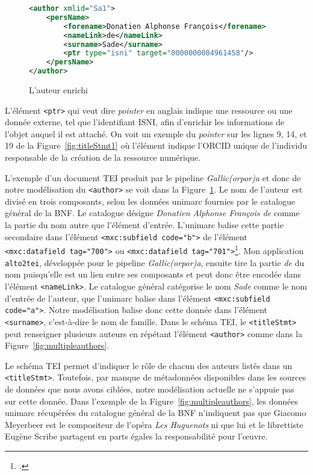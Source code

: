 \documentclass[class=article, crop=false]{standalone}
\begin{document}
\begin{figure}[ht]
\centering
\begin{lstlisting}[language=XML]
<author xmlid="Sa1">
	<persName>
		<forename>Donatien Alphonse François</forename>
		<nameLink>de</nameLink>
		<surname>Sade</surname>
		<ptr type="isni" target="0000000084961458"/>
	</persName>
</author>
\end{lstlisting}
\caption{L'auteur enrichi}
\label{fig:authorcomplex}
\end{figure}

\noindent L'élément \texttt{<ptr>} qui veut dire \textit{pointer} en anglais indique une ressource ou une donnée externe, tel que l'identifiant ISNI, afin d'enrichir les informations de l'objet auquel il est attaché. On voit un exemple du \textit{pointer} sur les lignes 9, 14, et 19 de la Figure~\ref{fig:titleStmt1} où l'élément indique l'ORCID unique de l'individu responsable de la création de la ressource numérique.

L'exemple d'un document \acrshort{TEI} produit par le pipeline \textit{Gallic(orpor)a} et donc de notre modélisation du \texttt{<author>} se voit dans la Figure~\ref{fig:authorcomplex}. Le nom de l'auteur est divisé en trois composants, selon les données \Gls{unimarc} fournies par le catalogue général de la \acrshort{BNF}. Le catalogue désigne \textit{Donatien Alphonse François de} comme la \og{}partie du nom autre que l’élément d’entrée\fg{}. L'\Gls{unimarc} balise cette partie secondaire dans l'élément \texttt{<mxc:subfield code="b">} de l'élément \texttt{<mxc:datafield tag="700">} ou \texttt{<mxc:datafield tag="701">}\footcite{ManuelUNIMARCFormat}. Mon application \texttt{alto2tei}, développée pour le pipeline \textit{Gallic(orpor)a}, ensuite tire la partie \textit{de} du nom puisqu'elle est un lien entre ses composants et peut donc être encodée dans l'élément \texttt{<nameLink>}. Le catalogue général catégorise le nom \textit{Sade} comme le nom d'entrée de l'auteur, que l'\Gls{unimarc} balise dans l'élément \texttt{<mxc:subfield code="a">}. Notre modélisation balise donc cette donnée dans l'élément \texttt{<surname>}, c'est-à-dire le nom de famille. Dans le schéma \acrshort{TEI}, le \texttt{<titleStmt>} peut renseigner plusieurs auteurs en répétant l'élément \texttt{<author>} comme dans la Figure~\ref{fig:multipleauthors}.

Le schéma \acrshort{TEI} permet d'indiquer le rôle de chacun des auteurs listés dans un \texttt{<titleStmt>}. Toutefois, par manque de métadonnées disponibles dans les sources de données que nous avons ciblées, notre modélisation actuelle ne s'appuie pas sur cette donnée. Dans l'exemple de la Figure~\ref{fig:multipleauthors}, les données \Gls{unimarc} récupérées du catalogue général de la \acrshort{BNF} n'indiquent pas que Giacomo Meyerbeer est le compositeur de l'opéra \textit{Les Huguenots} ni que lui et le librettiste Eugène Scribe partagent en parts égales la responsabilité pour l'œuvre.
\end{document}
